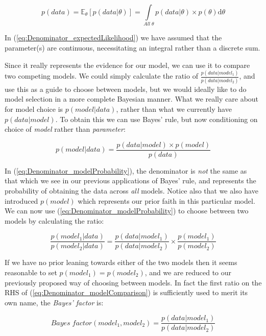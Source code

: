 \documentclass[11pt,fullpage]{book}
\begin{document}
\begin{equation}\label{eq:Denominator_expectedLikelihood}
p(data) = \mathbb{E}_\theta\left[p(data|\theta)\right] = \int\limits_{All\; \theta} p(data|\theta) \times p(\theta) \mathrm{d}\theta
\end{equation}

In (\ref{eq:Denominator_expectedLikelihood}) we have assumed that the parameter(s) are continuous, necessitating an integral rather than a discrete sum.

Since it really represents the evidence for our model, we can use it to compare two competing models. We could simply calculate the ratio of $\frac{p(data|model_1)}{p(data|model_2)}$, and use this as a guide to choose between models, but we would ideally like to do model selection in a more complete Bayesian manner. What we really care about for model choice is $p(model|data)$, rather than what we currently have $p(data|model)$. To obtain this we can use Bayes' rule, but now conditioning on choice of \textit{model} rather than \textit{parameter}:

\begin{equation}\label{eq:Denominator_modelProbability}
p(model|data) = \frac{p(data|model)\times p(model)}{p(data)}
\end{equation} 

In (\ref{eq:Denominator_modelProbability}), the denominator is \textit{not} the same as that which we see in our previous applications of Bayes' rule, and represents the probability of obtaining the data across \textit{all} models. Notice also that we also have introduced $p(model)$ which represents our prior faith in this particular model. We can now use (\ref{eq:Denominator_modelProbability}) to choose between two models by calculating the ratio:

\begin{equation}\label{eq:Denominator_modelComparison}
\frac{p(model_1|data)}{p(model_2|data)} = \frac{p(data|model_1)}{p(data|model_2)}\times \frac{p(model_1)}{p(model_2)}
\end{equation} 

If we have no prior leaning towards either of the two models then it seems reasonable to set $p(model_1)=p(model_2)$, and we are reduced to our previously proposed way of choosing between models. In fact the first ratio on the RHS of (\ref{eq:Denominator_modelComparison}) is sufficiently used to merit its own name, the \textit{Bayes' factor} is:

\begin{equation}\label{eq:Denominator_bayesFactor}
Bayes\; factor(model_1,model_2) = \frac{p(data|model_1)}{p(data|model_2)}
\end{equation}
\end{document}

